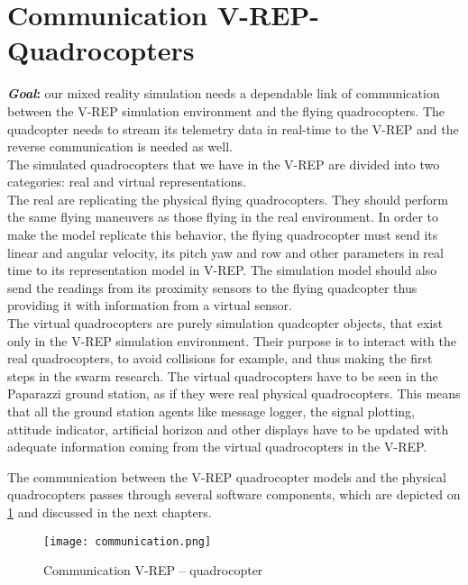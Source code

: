     \section{Communication V-REP-Quadrocopters}
    \label{sec:comm}
    \textbf{\textit{Goal}:} our mixed reality simulation needs a dependable link of communication between the V-REP simulation environment and the flying quadrocopters. 
    The quadcopter needs to stream its telemetry data in real-time to the V-REP and the reverse communication is needed as well.\\
    The simulated quadrocopters that we have in the V-REP are divided into two categories: real and virtual representations.\\ 
    The real are replicating the physical flying quadrocopters. They should perform the same flying maneuvers as those flying in the real environment. 
    In order to make the model replicate this behavior, the flying quadrocopter must send its linear and angular velocity, its pitch yaw and row and other parameters in real time to its representation model in V-REP. 
    The simulation model should also send the readings from its proximity sensors to the flying quadcopter thus providing it with information from a virtual sensor. \\
    The virtual quadrocopters are purely simulation quadcopter objects, that exist only in the V-REP simulation environment. 
    Their purpose is to interact with the real quadrocopters, to avoid collisions  for example, and thus making the first steps in the swarm research. 
    The virtual quadrocopters have to be seen in the Paparazzi ground station, as if they were real physical quadrocopters. 
    This means that all the ground station agents like message logger, the signal plotting, attitude indicator, artificial horizon and other displays have to be updated with adequate information coming from the virtual quadrocopters in the V-REP.
    
    The communication between the V-REP quadrocopter models and the physical quadrocopters passes through several software components, which are depicted on  \ref{fig:communication} and discussed in the next chapters.
    
    \begin{figure}[h!]
     \begin{center}
      \texttt{[image: communication.png]}
     \end{center}
      \caption{Communication V-REP -- quadrocopter\label{fig:communication}}
    \end{figure}
    
